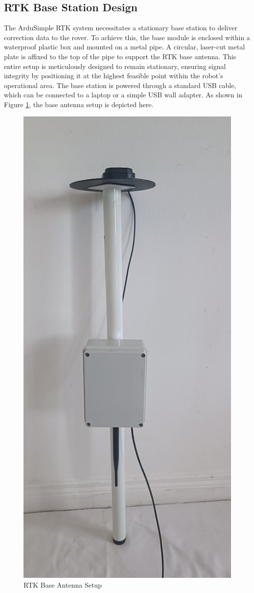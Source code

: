 \subsection{RTK Base Station Design}
\label{ssec:rtk_base_design}
The ArduSimple RTK system necessitates a stationary base station to deliver correction data to the rover. To achieve this, the base module is enclosed within a waterproof plastic box and mounted on a metal pipe. A circular, laser-cut metal plate is affixed to the top of the pipe to support the RTK base antenna. This entire setup is meticulously designed to remain stationary, ensuring signal integrity by positioning it at the highest feasible point within the robot's operational area. The base station is powered through a standard USB cable, which can be connected to a laptop or a simple USB wall adapter. As shown in Figure \ref{fig:base_antenna}, the base antenna setup is depicted here.

\begin{figure}[H]
    \centering
    \includegraphics[width=0.7\linewidth]{figures/base_antenna.png}
    \caption{RTK Base Antenna Setup}
    \label{fig:base_antenna}
\end{figure}

